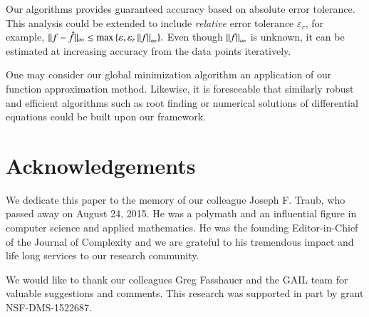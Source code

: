 \documentclass[review]{elsarticle}
\theoremstyle{definition}
\begin{document}
Our algorithms provides guaranteed accuracy based on absolute error tolerance.
This analysis could be extended to include \emph{relative} error tolerance
$\varepsilon_r$, for example, $ \| f -\hat{f} \|_{\infty} \le \max{
\{\varepsilon, \varepsilon_r \norm[\infty]{f} \} }.$ Even though
$\norm[\infty]{f}$ is unknown, it can be estimated at increasing accuracy from
the data points iteratively.

One may consider our global minimization algorithm an application of our
function approximation method. Likewise, it is foreseeable that
similarly robust and efficient algorithms such as root finding or
numerical solutions of differential equations could be built upon our framework.


\section*{Acknowledgements}
We dedicate this paper to the memory of our colleague Joseph F. Traub, who
passed away on August 24, 2015. He was a polymath and an influential figure in
computer science and applied mathematics. He was the founding Editor-in-Chief of
the Journal of Complexity and we are grateful to his tremendous impact and life
long services to our research community.

We would like to thank our colleagues Greg Fasshauer and the GAIL team
for valuable suggestions and comments. This research was supported in part by
grant NSF-DMS-1522687.





\end{document}
